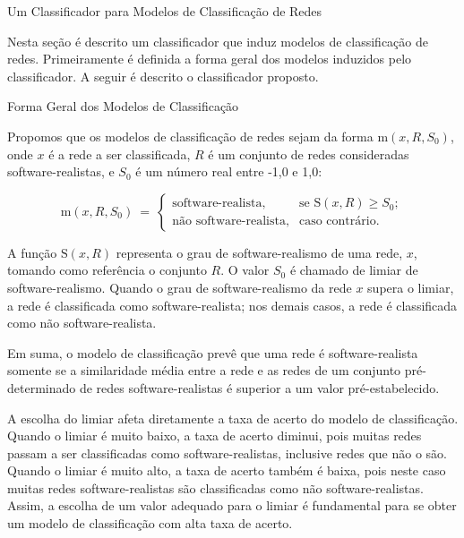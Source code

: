 \begin{section}{Um Classificador para Modelos de Classificação de Redes} \label{cap:clas2}
	
	Nesta seção é descrito um classificador que induz modelos de classificação de redes. Primeiramente é definida a forma geral dos modelos induzidos pelo classificador. A seguir é descrito o classificador proposto.
	
\begin{subsection}{Forma Geral dos Modelos de Classificação}
	
	Propomos que os modelos de classificação de redes sejam da forma $\mathrm{m}(x, R, S_0)$, onde $x$ é a rede a ser classificada, $R$ é um conjunto de redes consideradas software-realistas, e $S_0$ é um número real entre -1,0 e 1,0:
	
$$
	\mathrm{m}(x, R, S_0) ~=~
	\left\{
	\begin{array}{cl}
	\mbox{software-realista,} & \mbox{se } \mathrm{S}(x, R) \ge S_0; \\
	\mbox{não software-realista,} & \mbox{caso contrário.}
	\end{array}
	\right.
$$
	
	A função $\mathrm{S}(x, R)$ representa o grau de software-realismo de uma rede, $x$, tomando como referência o conjunto $R$. O valor $S_0$ é chamado de limiar de software-realismo. Quando o grau de software-realismo da rede $x$ supera o limiar, a rede é classificada como software-realista; nos demais casos, a rede é classificada como não software-realista.
	
	
	Em suma, o modelo de classificação prevê que uma rede é software-realista somente se a similaridade média entre a rede e as redes de um conjunto pré-determinado de redes software-realistas é superior a um valor pré-estabelecido.
	
	A escolha do limiar afeta diretamente a taxa de acerto do modelo de classificação. Quando o limiar é muito baixo, a taxa de acerto diminui, pois muitas redes passam a ser classificadas como software-realistas, inclusive redes que não o são. Quando o limiar é muito alto, a taxa de acerto também é baixa, pois neste caso muitas redes software-realistas são classificadas como não software-realistas. Assim, a escolha de um valor adequado para o limiar é fundamental para se obter um modelo de classificação com alta taxa de acerto.


\end{subsection}
\end{section}
